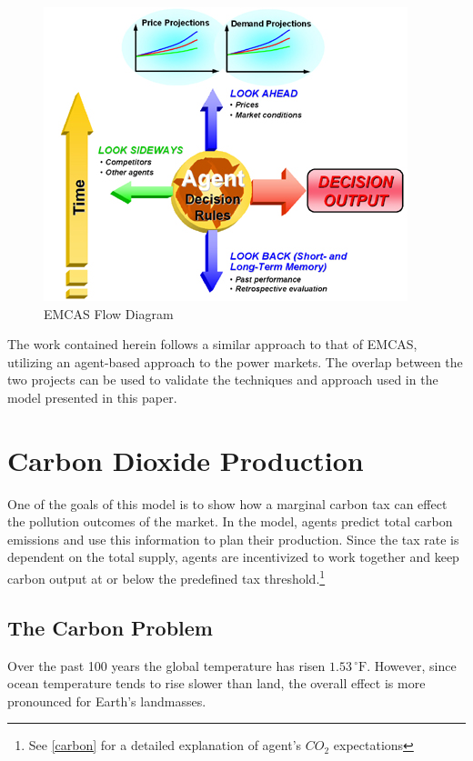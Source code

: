 \documentclass[12pt]{article}
\begin{document}
\begin{figure}[H]
	\begin{center}
	\includegraphics[scale = .75]{EMCAS}
	\caption{EMCAS Flow Diagram \cite{EMCAS}}
	\end{center}
\end{figure}

The work contained herein follows a similar approach to that of EMCAS, utilizing an agent-based approach to the power markets. The overlap between the two projects can be used to validate the techniques and approach used in the model presented in this paper.

  

\section{Carbon Dioxide Production}


One of the goals of this model is to show how a marginal carbon tax can effect the pollution outcomes of the market. In the model, agents predict total carbon emissions and use this information to plan their production. Since the tax rate is dependent on the total supply, agents are incentivized to work together and keep carbon output at or below the predefined tax threshold.\footnote{See \cref{carbon} for a detailed explanation of agent's $CO_2$ expectations} \*

\subsection{The Carbon Problem}
Over the past 100 years the global temperature has risen $1.53\,^{\circ}\mathrm{F}$. However, since ocean temperature tends to rise slower than land, the overall effect is more pronounced for Earth's landmasses. 
\end{document}
